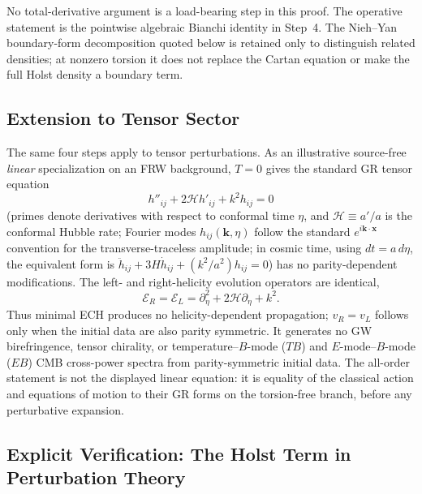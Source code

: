 \documentclass[aps,prd,twocolumn,superscriptaddress,preprintnumbers,nofootinbib,longbibliography,floatfix]{revtex4-2}
\begin{document}
No total-derivative argument is a load-bearing step in this proof.  The
operative statement is the pointwise algebraic Bianchi identity in Step~4.
The Nieh--Yan boundary-form decomposition quoted below is retained only to
distinguish related densities; at nonzero torsion it does not replace the
Cartan equation or make the full Holst density a boundary term.

\subsection{Extension to Tensor Sector}

The same four steps apply to tensor perturbations.  As an illustrative
source-free \emph{linear} specialization on an FRW background, $T=0$ gives
the standard GR tensor equation
\begin{equation}
h''_{ij} + 2\mathcal{H}h'_{ij} + k^2 h_{ij} = 0
\end{equation}
(primes denote derivatives with respect to conformal time $\eta$, and
$\mathcal{H}\equiv a'/a$ is the conformal Hubble rate; Fourier modes
$h_{ij}(\mathbf{k},\eta)$ follow the standard
$e^{i\mathbf{k}\cdot\mathbf{x}}$ convention for the transverse-traceless
amplitude; in cosmic time, using $dt = a\,d\eta$, the
equivalent form is $\ddot h_{ij} + 3H\dot h_{ij} + (k^2/a^2)h_{ij}=0$)
has no parity-dependent modifications.  The left- and right-helicity
evolution operators are identical,
\begin{equation}
\mathcal E_R=\mathcal E_L=\partial_\eta^2+2\mathcal H\partial_\eta+k^2.
\end{equation}
Thus minimal ECH produces no helicity-dependent propagation; $v_R=v_L$ follows
only when the initial data are also parity symmetric.  It generates no GW
birefringence, tensor chirality, or temperature--$B$-mode ($TB$) and
$E$-mode--$B$-mode ($EB$) CMB cross-power spectra from
parity-symmetric initial data.
The all-order statement is not the displayed linear equation: it is equality
of the classical action and equations of motion to their GR forms on the
torsion-free branch, before any perturbative expansion.

\subsection{Explicit Verification: The Holst Term in Perturbation Theory}\label{sec:transp_holst}
\end{document}
